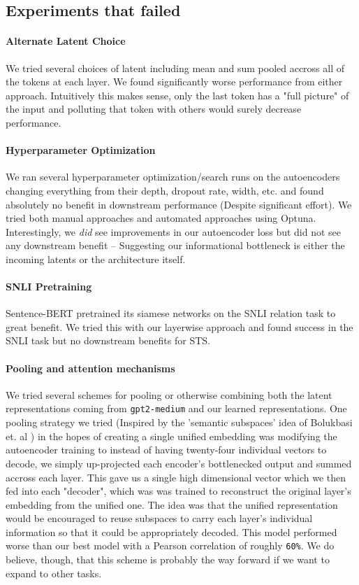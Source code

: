 \documentclass{article}
\begin{document}
\subsection{Experiments that failed}

\paragraph*{Alternate Latent Choice}
We tried several choices of latent including mean and sum pooled accross all of the tokens at each layer. We found significantly worse performance from either approach. Intuitively this makes sense, only the last token has a "full picture" of the input and polluting that token with others would surely decrease performance. 

\paragraph*{Hyperparameter Optimization}
We ran several hyperparameter optimization/search runs on the autoencoders changing everything from their depth, dropout rate, width, etc. and found absolutely no benefit in downstream performance (Despite significant effort). We tried both manual approaches and automated approaches using Optuna. Interestingly, we \textit{did} see improvements in our autoencoder loss but did not see any downstream benefit -- Suggesting our informational bottleneck is either the incoming latents or the architecture itself.

\paragraph*{SNLI Pretraining}
Sentence-BERT \cite{reimers2019sentencebertsentenceembeddingsusing} pretrained its siamese networks on the SNLI \cite{snli} relation task to great benefit. We tried this with our layerwise approach and found success in the SNLI task but no downstream benefits for STS.

\paragraph*{Pooling and attention mechanisms}
We tried several schemes for pooling or otherwise combining both the latent representations coming from \verb|gpt2-medium| and our learned representations. One pooling strategy we tried (Inspired by the 'semantic subspaces' idea of Bolukbasi et. al \cite{bolukbasi2016mancomputerprogrammerwoman}) in the hopes of creating a single unified embedding was modifying the autoencoder training to instead of having twenty-four individual vectors to decode, we simply up-projected each encoder's bottlenecked output and summed accross each layer. This gave us a single high dimensional vector which we then fed into each "decoder", which was was trained to reconstruct the original layer's embedding from the unified one. The idea was that the unified representation would be encouraged to reuse subspaces to carry each layer's individual information so that it could be appropriately decoded. This model performed worse than our best model with a Pearson correlation of roughly \verb|60%|. We do believe, though, that this scheme is probably the way forward if we want to expand to other tasks.
\end{document}
